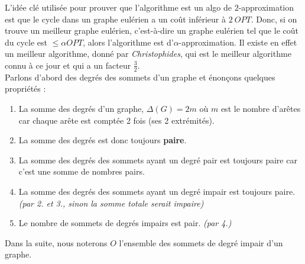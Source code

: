 \documentclass[12pt]{article}
\begin{document}
L'idée clé utilisée pour prouver que l'algorithme est un algo de $2$-approximation est que le cycle dans un graphe eulérien a un coût
inférieur à $2\ OPT$. Donc, si on trouve un meilleur graphe eulérien, c'est-à-dire un graphe eulérien tel que le coût du cycle est $\leq
\alpha OPT$, alors l'algorithme est d'$\alpha$-approximation. Il existe en effet un meilleur algorithme, donné par \textit{Christophides},
qui est le meilleur algorithme connu à ce jour et qui a un facteur $\frac 3 2$. \\
Parlons d'abord des degrés des sommets d'un graphe et énonçons quelques propriétés :
\begin{enumerate}
\item La somme des degrés d'un graphe, $\Delta(G) = 2m$ où $m$ est le nombre d'arêtes car chaque arête est comptée 2 fois (ses 2
extrémités).
\item La somme des degrés est donc toujours \textbf{paire}.
\item La somme des degrés des sommets ayant un degré pair est toujours paire car c'est une somme de nombres pairs.
\item La somme des degrés des sommets ayant un degré impair est toujours paire. \textit{(par 2. et 3., sinon la somme totale serait
impaire)}
\item Le nombre de sommets de degrés impairs est pair. \textit{(par 4.)}
\end{enumerate}
Dans la suite, nous noterons $O$ l'ensemble des sommets de degré impair d'un graphe.
\end{document}
